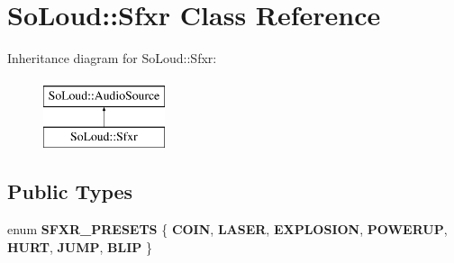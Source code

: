 \hypertarget{class_so_loud_1_1_sfxr}{}\section{So\+Loud\+::Sfxr Class Reference}
\label{class_so_loud_1_1_sfxr}
Inheritance diagram for So\+Loud\+::Sfxr\+:\begin{figure}[H]
\begin{center}
\leavevmode
\includegraphics[height=2.000000cm]{class_so_loud_1_1_sfxr}
\end{center}
\end{figure}
\subsection*{Public Types}
\begin{DoxyCompactItemize}
\item 
\mbox{\label{class_so_loud_1_1_sfxr_afda1c6ce4460589ccb57f2a515ad84fa}} 
enum {\bfseries S\+F\+X\+R\+\_\+\+P\+R\+E\+S\+E\+TS} \{ \newline
{\bfseries C\+O\+IN}, 
{\bfseries L\+A\+S\+ER}, 
{\bfseries E\+X\+P\+L\+O\+S\+I\+ON}, 
{\bfseries P\+O\+W\+E\+R\+UP}, 
\newline
{\bfseries H\+U\+RT}, 
{\bfseries J\+U\+MP}, 
{\bfseries B\+L\+IP}
 \}
\end{DoxyCompactItemize}
